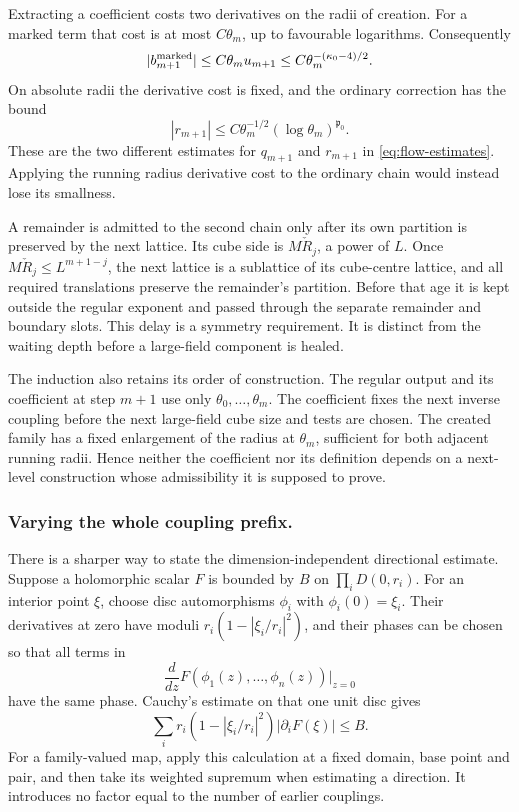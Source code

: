 \documentclass[11pt,letterpaper,reqno]{amsart}
\theoremstyle{definition}
\theoremstyle{remark}
\begin{document}
Extracting a coefficient costs two derivatives on the radii
of creation. For a marked term that cost is at most
$C\theta_m$, up to favourable logarithms. Consequently
\[
 |b^{\rm marked}_{m+1}|
       \le C\theta_m u_{m+1}
       \le C\theta_m^{-(\kappa_0-4)/2}.
\]
On absolute radii the derivative cost is fixed, and the
ordinary correction has the bound
\[
 |r_{m+1}|\le C\theta_m^{-1/2}(\log\theta_m)^{\mathfrak p_0}.
\]
These are the two different estimates for $q_{m+1}$ and
$r_{m+1}$ in \eqref{eq:flow-estimates}. Applying the running
radius derivative cost to the ordinary chain would instead
lose its smallness.

A remainder is admitted to the second chain only after
its own partition is preserved by the next lattice. Its
cube side is $M\check R_j$, a power of $L$. Once
$M\check R_j\le L^{m+1-j}$, the next lattice is a sublattice
of its cube-centre lattice, and all required translations
preserve the remainder's partition. Before that age it is
kept outside the regular exponent and passed through the
separate remainder and boundary slots. This delay is a
symmetry requirement. It is distinct from the waiting depth
before a large-field component is healed.

The induction also retains its order of construction. The
regular output and its coefficient at step $m+1$ use only
$\theta_0,\ldots,\theta_m$. The coefficient fixes the next
inverse coupling before the next large-field cube size and
tests are chosen. The created family has a fixed enlargement
of the radius at $\theta_m$, sufficient for both adjacent
running radii. Hence neither the coefficient nor its
definition depends on a next-level construction whose
admissibility it is supposed to prove.

\subsubsection*{Varying the whole coupling prefix.}
There is a sharper way to state the dimension-independent
directional estimate. Suppose a holomorphic scalar $F$ is
bounded by $B$ on $\prod_iD(0,r_i)$. For an interior point
$\xi$, choose disc automorphisms $\phi_i$ with
$\phi_i(0)=\xi_i$. Their derivatives at zero have moduli
$r_i(1-|\xi_i/r_i|^2)$, and their phases can be chosen so
that all terms in
\[
 \frac d{dz}F(\phi_1(z),\ldots,\phi_n(z))\bigg|_{z=0}
\]
have the same phase. Cauchy's estimate on that one unit
disc gives
\begin{equation}\label{eq:deep-polydisc-slope}
 \sum_i r_i(1-|\xi_i/r_i|^2)|\partial_iF(\xi)|\le B.
\end{equation}
For a family-valued map, apply this calculation at a fixed
domain, base point and pair, and then take its weighted
supremum when estimating a direction. It introduces no
factor equal to the number of earlier couplings.
\end{document}
